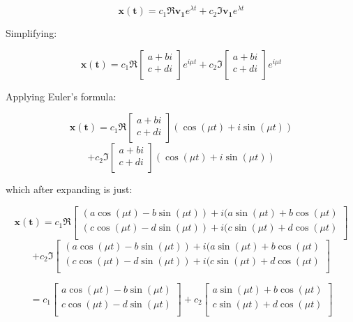 \documentclass{report}
\begin{document}
{$$\mathbf{x(t)} = c_1\Re{\mathbf{v_1}e^{\lambda t}} + c_2\Im{\mathbf{v_1}e^{\lambda t}}$$

Simplifying:

$$\mathbf{x(t)} = c_1\Re{\begin{bmatrix}
    a + bi \\
    c + di \\
\end{bmatrix}
e^{i\mu t}} + c_2\Im{\begin{bmatrix}
    a + bi \\
    c + di \\
\end{bmatrix}
e^{i\mu t}}$$

Applying Euler's formula:

$$\mathbf{x(t)} = c_1\Re{\begin{bmatrix}
    a + bi \\
    c + di \\
\end{bmatrix}
(\cos(\mu t) + i\sin(\mu t))}
$$
$$+ c_2\Im{\begin{bmatrix}
    a + bi \\
    c + di \\
\end{bmatrix}
(\cos(\mu t) + i\sin(\mu t))}$$

which after expanding is just:

$$\mathbf{x(t)} = c_1\Re{
\begin{bmatrix}
    (a\cos(\mu t) - b\sin(\mu t)) + i(a\sin(\mu t) + b\cos(\mu t) \\
    (c\cos(\mu t) - d\sin(\mu t)) + i(c\sin(\mu t) + d\cos(\mu t) \\
\end{bmatrix}}
$$
$$+ c_2\Im{
\begin{bmatrix}
    (a\cos(\mu t) - b\sin(\mu t)) + i(a\sin(\mu t) + b\cos(\mu t) \\
    (c\cos(\mu t) - d\sin(\mu t)) + i(c\sin(\mu t) + d\cos(\mu t) \\
\end{bmatrix}}
$$

$$= c_1
\begin{bmatrix}
    a\cos(\mu t) - b\sin(\mu t) \\
    c\cos(\mu t) - d\sin(\mu t) \\
\end{bmatrix}
+ c_2
\begin{bmatrix}
    a\sin(\mu t) + b\cos(\mu t) \\
    c\sin(\mu t) + d\cos(\mu t) \\
\end{bmatrix}
$$

}
\end{document}
